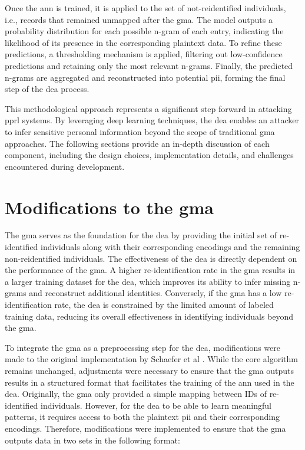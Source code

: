 Once the \ac{ann} is trained, it is applied to the set of not-reidentified individuals, i.e., records that remained unmapped after the \ac{gma}.
The model outputs a probability distribution for each possible n-gram of each entry, indicating the likelihood of its presence in the corresponding plaintext data.
To refine these predictions, a thresholding mechanism is applied, filtering out low-confidence predictions and retaining only the most relevant n-grams.
Finally, the predicted n-grams are aggregated and reconstructed into potential \ac{pii}, forming the final step of the \ac{dea} process.

This methodological approach represents a significant step forward in attacking \ac{pprl} systems.
By leveraging deep learning techniques, the \ac{dea} enables an attacker to infer sensitive personal information beyond the scope of traditional \ac{gma} approaches.
The following sections provide an in-depth discussion of each component, including the design choices, implementation details, and challenges encountered during development.

\section{Modifications to the \ac{gma}} \label{sec:modifications}

The \ac{gma} serves as the foundation for the \ac{dea} by providing the initial set of re-identified individuals along with their corresponding encodings and the remaining non-reidentified individuals.
The effectiveness of the \ac{dea} is directly dependent on the performance of the \ac{gma}.
A higher re-identification rate in the \ac{gma} results in a larger training dataset for the \ac{dea}, which improves its ability to infer missing n-grams and reconstruct additional identities.
Conversely, if the \ac{gma} has a low re-identification rate, the \ac{dea} is constrained by the limited amount of labeled training data, reducing its overall effectiveness in identifying individuals beyond the \ac{gma}.

To integrate the \ac{gma} as a preprocessing step for the \ac{dea}, modifications were made to the original implementation by Schaefer et al \cite{schaefer2024}.
While the core algorithm remains unchanged, adjustments were necessary to ensure that the \ac{gma} outputs results in a structured format that facilitates the training of the \ac{ann} used in the \ac{dea}.
Originally, the \ac{gma} only provided a simple mapping between IDs of re-identified individuals.
However, for the \ac{dea} to be able to learn meaningful patterns, it requires access to both the plaintext \ac{pii} and their corresponding encodings.
Therefore, modifications were implemented to ensure that the \ac{gma} outputs data in two sets in the following format:

